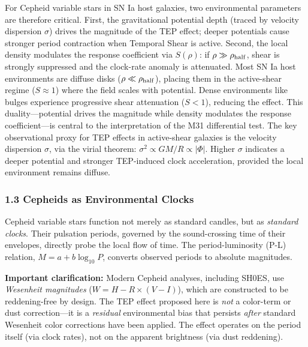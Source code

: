 \documentclass[
]{article}
\begin{document}
For Cepheid variable stars in SN Ia host galaxies, two environmental
parameters are therefore critical. First, the gravitational potential
depth (traced by velocity dispersion \(\sigma\)) drives the magnitude of
the TEP effect; deeper potentials cause stronger period contraction when
Temporal Shear is active. Second, the local density modulates the
response coefficient via \(S(\rho)\): if \(\rho \gg \rho_{\rm half}\),
shear is strongly suppressed and the clock-rate anomaly is attenuated.
Most SN Ia host environments are diffuse disks
(\(\rho \ll \rho_{\rm half}\)), placing them in the active-shear regime
(\(S \approx 1\)) where the field scales with potential. Dense
environments like bulges experience progressive shear attenuation
(\(S < 1\)), reducing the effect. This duality---potential drives the
magnitude while density modulates the response coefficient---is central
to the interpretation of the M31 differential test. The key
observational proxy for TEP effects in active-shear galaxies is the
velocity dispersion \(\sigma\), via the virial theorem:
\(\sigma^2 \propto GM/R \propto |\Phi|\). Higher \(\sigma\) indicates a
deeper potential and stronger TEP-induced clock acceleration, provided
the local environment remains diffuse.

\subsubsection{1.3 Cepheids as Environmental
Clocks}\label{cepheids-as-environmental-clocks}

Cepheid variable stars function not merely as standard candles, but as
\emph{standard clocks}. Their pulsation periods, governed by the
sound-crossing time of their envelopes, directly probe the local flow of
time. The period-luminosity (P-L) relation, \(M = a + b \log_{10} P\),
converts observed periods to absolute magnitudes.

\textbf{Important clarification:} Modern Cepheid analyses, including
SH0ES, use \emph{Wesenheit magnitudes} (\(W = H - R \times (V-I)\)),
which are constructed to be reddening-free by design. The TEP effect
proposed here is \emph{not} a color-term or dust correction---it is a
\emph{residual} environmental bias that persists \emph{after} standard
Wesenheit color corrections have been applied. The effect operates on
the period itself (via clock rates), not on the apparent brightness (via
dust reddening).
\end{document}
